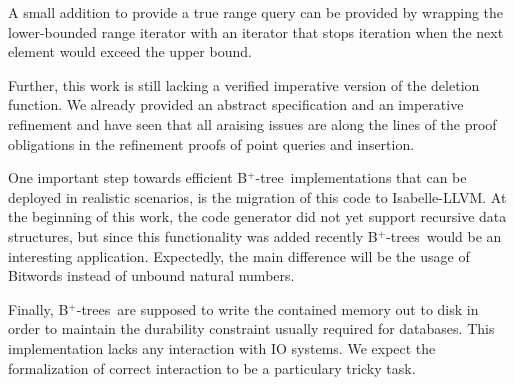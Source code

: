 \documentclass[a4paper,UKenglish,cleveref, autoref, thm-restate]{lipics-v2021}
\newcommand{\btree}{B$^+$-tree}
\newcommand{\btrees}{B$^+$-trees}
\begin{document}
A small addition to provide a true
range query can be provided by wrapping the lower-bounded
range iterator with an iterator
that stops iteration when the next element
would exceed the upper bound.

Further, this work is still lacking a verified imperative version
of the deletion function.
We already provided an abstract specification
and an imperative refinement and have seen
that all araising issues are along the lines
of the proof obligations in the refinement
proofs of point queries and insertion.

One important step towards efficient
\btree\ implementations that can be deployed
in realistic scenarios, is the migration of this code
to Isabelle-LLVM. \cite{DBLP:conf/itp/Lammich19}
At the beginning of this work, the code generator did
not yet support recursive data structures, but since
this functionality was added recently \btrees\ would be an interesting application.
Expectedly, the main difference will be the usage of Bitwords
instead of unbound natural numbers.

Finally, \btrees\ are supposed to write the contained
memory out to disk in order to maintain the durability constraint
usually required for databases.
This implementation lacks any interaction with IO systems.
We expect the formalization of correct interaction 
to be a particulary tricky task.



\end{document}
